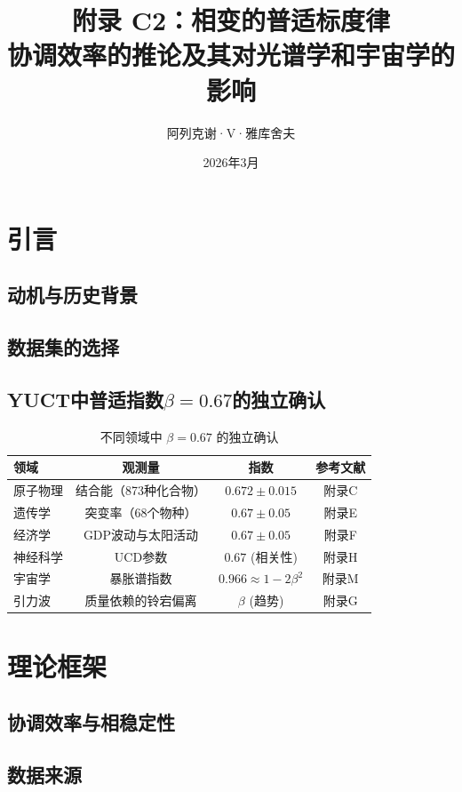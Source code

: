 \documentclass[11pt,a4paper]{article}
\title{附录 C2：相变的普适标度律\\
	\large 协调效率的推论及其对光谱学和宇宙学的影响}
\author{阿列克谢·V·雅库舍夫}
\date{2026年3月}
\begin{document}
	
	\maketitle
	\tableofcontents
	
	\section{引言}
	\subsection{动机与历史背景}
	\subsection{数据集的选择}
	\subsection{YUCT中普适指数\(\beta = 0.67\)的独立确认}
	
	\begin{table}[htbp]
		\centering
		\caption{不同领域中 \(\beta = 0.67\) 的独立确认}
		\label{tab:beta_confirmation}
		\begin{tabular}{@{}lccc@{}}
			\toprule
			\textbf{领域} & \textbf{观测量} & \textbf{指数} & \textbf{参考文献} \\
			\midrule
			原子物理 & 结合能（873种化合物） & \(0.672\pm0.015\) & 附录C \\
			遗传学 & 突变率（68个物种） & \(0.67\pm0.05\) & 附录E \\
			经济学 & GDP波动与太阳活动 & \(0.67\pm0.05\) & 附录F \\
			神经科学 & UCD参数 & \(0.67\) (相关性) & 附录H \\
			宇宙学 & 暴胀谱指数 & \(0.966 \approx 1-2\beta^2\) & 附录M \\
			引力波 & 质量依赖的铃宕偏离 & \(\beta\) (趋势) & 附录G \\
			\bottomrule
		\end{tabular}
	\end{table}
	
	\section{理论框架}
	\subsection{协调效率与相稳定性}
	\subsection{数据来源}
\end{document}
